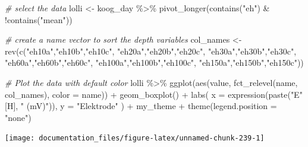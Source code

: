\documentclass[
]{article}
\newenvironment{Shaded}{\begin{snugshade}}{\end{snugshade}}
\newcommand{\AttributeTok}[1]{\textcolor[rgb]{0.77,0.63,0.00}{#1}}
\newcommand{\CommentTok}[1]{\textcolor[rgb]{0.56,0.35,0.01}{\textit{#1}}}
\newcommand{\FunctionTok}[1]{\textcolor[rgb]{0.00,0.00,0.00}{#1}}
\newcommand{\NormalTok}[1]{#1}
\newcommand{\OtherTok}[1]{\textcolor[rgb]{0.56,0.35,0.01}{#1}}
\newcommand{\SpecialCharTok}[1]{\textcolor[rgb]{0.00,0.00,0.00}{#1}}
\newcommand{\StringTok}[1]{\textcolor[rgb]{0.31,0.60,0.02}{#1}}
\begin{document}
\begin{Shaded}
\begin{Highlighting}[]
\CommentTok{\# select the data}
\NormalTok{lolli }\OtherTok{\textless{}{-}}\NormalTok{ koog\_day }\SpecialCharTok{\%\textgreater{}\%}
  \FunctionTok{pivot\_longer}\NormalTok{(}\FunctionTok{contains}\NormalTok{(}\StringTok{"eh"}\NormalTok{) }\SpecialCharTok{\&} \SpecialCharTok{!}\FunctionTok{contains}\NormalTok{(}\StringTok{"mean"}\NormalTok{))}

\CommentTok{\# create a name vector to sort the depth variables}
\NormalTok{col\_names }\OtherTok{\textless{}{-}} \FunctionTok{rev}\NormalTok{(}\FunctionTok{c}\NormalTok{(}\StringTok{"eh10a"}\NormalTok{,}\StringTok{"eh10b"}\NormalTok{,}\StringTok{"eh10c"}\NormalTok{,}
                   \StringTok{"eh20a"}\NormalTok{,}\StringTok{"eh20b"}\NormalTok{,}\StringTok{"eh20c"}\NormalTok{,}
                   \StringTok{"eh30a"}\NormalTok{,}\StringTok{"eh30b"}\NormalTok{,}\StringTok{"eh30c"}\NormalTok{,}
                                           \StringTok{"eh60a"}\NormalTok{,}\StringTok{"eh60b"}\NormalTok{,}\StringTok{"eh60c"}\NormalTok{,}
                                           \StringTok{"eh100a"}\NormalTok{,}\StringTok{"eh100b"}\NormalTok{,}\StringTok{"eh100c"}\NormalTok{,}
                                           \StringTok{"eh150a"}\NormalTok{,}\StringTok{"eh150b"}\NormalTok{,}\StringTok{"eh150c"}\NormalTok{))}
  
\CommentTok{\# Plot the data with default color}
\NormalTok{lolli }\SpecialCharTok{\%\textgreater{}\%}
  \FunctionTok{ggplot}\NormalTok{(}\FunctionTok{aes}\NormalTok{(value, }\FunctionTok{fct\_relevel}\NormalTok{(name, col\_names), }\AttributeTok{color =}\NormalTok{ name)) }\SpecialCharTok{+} 
  \FunctionTok{geom\_boxplot}\NormalTok{() }\SpecialCharTok{+}
  \FunctionTok{labs}\NormalTok{(}
    \AttributeTok{x =} \FunctionTok{expression}\NormalTok{(}\FunctionTok{paste}\NormalTok{(}\StringTok{"E"}\NormalTok{ [H], }\StringTok{" (mV)"}\NormalTok{)),}
    \AttributeTok{y =} \StringTok{"Elektrode"}
\NormalTok{  ) }\SpecialCharTok{+}
\NormalTok{  my\_theme }\SpecialCharTok{+}
  \FunctionTok{theme}\NormalTok{(}\AttributeTok{legend.position =} \StringTok{"none"}\NormalTok{)}
\end{Highlighting}
\end{Shaded}

\begin{center}\texttt{[image: documentation\_files/figure-latex/unnamed-chunk-239-1]} \end{center}
\end{document}
